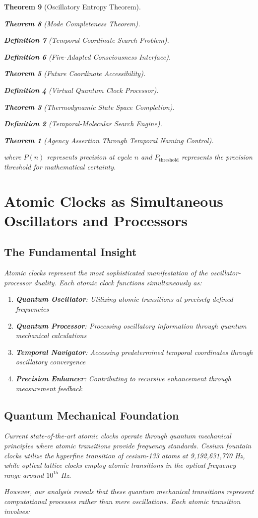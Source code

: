 \documentclass[12pt,a4paper]{article}
\newtheorem{theorem}{Theorem}[section]
\newtheorem{definition}[theorem]{Definition}
\begin{document}
\begin{theorem}[Oscillatory Entropy Theorem]
\begin{theorem}[Mode Completeness Theorem]
\begin{enumerate}
\begin{definition}[Temporal Coordinate Search Problem]
\begin{algorithm}
\begin{definition}[Fire-Adapted Consciousness Interface]
\begin{theorem}[Future Coordinate Accessibility]
\begin{definition}[Virtual Quantum Clock Processor]
\begin{itemize}
\begin{itemize}
\begin{theorem}[Thermodynamic State Space Completion]
\begin{definition}[Temporal-Molecular Search Engine]
\begin{theorem}[Agency Assertion Through Temporal Naming Control]
\begin{remark}
where $P(n)$ represents precision at cycle $n$ and $P_{\text{threshold}}$ represents the precision threshold for mathematical certainty.

\section{Atomic Clocks as Simultaneous Oscillators and Processors}

\subsection{The Fundamental Insight}

Atomic clocks represent the most sophisticated manifestation of the oscillator-processor duality. Each atomic clock functions simultaneously as:

\begin{enumerate}
\item \textbf{Quantum Oscillator}: Utilizing atomic transitions at precisely defined frequencies
\item \textbf{Quantum Processor}: Processing oscillatory information through quantum mechanical calculations
\item \textbf{Temporal Navigator}: Accessing predetermined temporal coordinates through oscillatory convergence
\item \textbf{Precision Enhancer}: Contributing to recursive enhancement through measurement feedback
\end{enumerate}

\subsection{Quantum Mechanical Foundation}

Current state-of-the-art atomic clocks operate through quantum mechanical principles where atomic transitions provide frequency standards. Cesium fountain clocks utilize the hyperfine transition of cesium-133 atoms at 9,192,631,770 Hz, while optical lattice clocks employ atomic transitions in the optical frequency range around $10^{15}$ Hz.

However, our analysis reveals that these quantum mechanical transitions represent computational processes rather than mere oscillations. Each atomic transition involves:


\end{remark}
\end{theorem}
\end{definition}
\end{theorem}
\end{itemize}
\end{itemize}
\end{definition}
\end{theorem}
\end{definition}
\end{algorithm}
\end{definition}
\end{enumerate}
\end{theorem}
\end{theorem}
\end{document}
